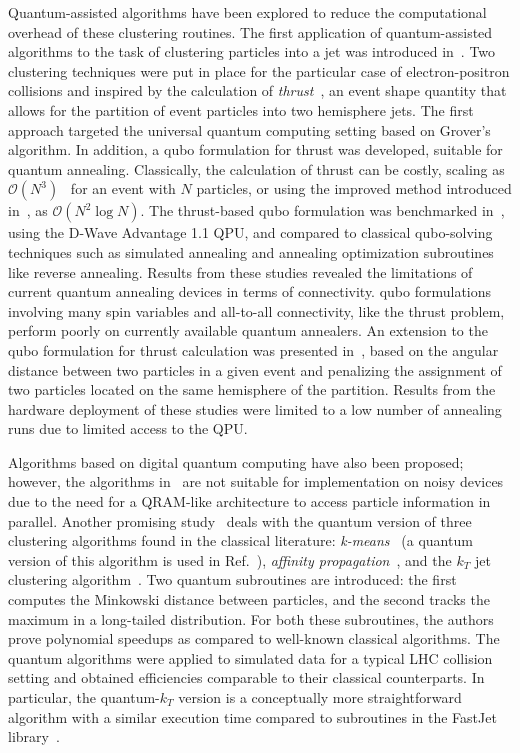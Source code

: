 Quantum-assisted algorithms have been explored to reduce the computational overhead of these clustering routines. The first application of quantum-assisted algorithms to the task of clustering particles into a jet was introduced in~\cite{Wei2020}. Two clustering techniques were put in place for the particular case of electron-positron collisions and inspired by the calculation of \textit{thrust}~\cite{BRANDT196457,PhysRevLett.39.1587}, an event shape quantity that allows for the partition of event particles into two hemisphere jets. The first approach targeted the universal quantum computing setting based on Grover's algorithm. In addition, a \gls{qubo} formulation for thrust was developed, suitable for quantum annealing. Classically, the calculation of thrust can be costly, scaling as $\mathcal{O}(N^3)$~\cite{YAMAMOTO1983597} for an event with $N$ particles, or using the improved method introduced in~\cite{Salam_2007}, as $\mathcal{O}(N^2 \log N)$. The thrust-based \gls{qubo} formulation was benchmarked in~\cite{DelgadoThaler2022}, using the D-Wave Advantage 1.1 QPU, and compared to classical \gls{qubo}-solving techniques such as simulated annealing and annealing optimization subroutines like reverse annealing. Results from these studies revealed the limitations of current quantum annealing devices in terms of connectivity. \gls{qubo} formulations involving many spin variables and all-to-all connectivity, like the thrust problem, perform poorly on currently available quantum annealers. An extension to the \gls{qubo} formulation for thrust calculation was presented in~\cite{pires2020adiabatic}, based on the angular distance between two particles in a given event and penalizing the assignment of two particles located on the same hemisphere of the partition. Results from the hardware deployment of these studies were limited to a low number of annealing runs due to limited access to the QPU.

Algorithms based on digital quantum computing have also been proposed; however, the algorithms in~\cite{pires2021digital, Wei2020} are not suitable for implementation on noisy devices due to the need for a QRAM-like architecture to access particle information in parallel. Another promising study~\cite{deLejarza:2022bwc} deals with the quantum version of three clustering algorithms found in the classical literature: \textit{k-means}~\cite{MacQueen1967} (a quantum version of this algorithm is used in Ref.~\cite{pires2021digital}), \textit{affinity propagation}~\cite{Brendan2007}, and the \textit{$k_T$} jet clustering algorithm~\cite{PhysRevD.48.3160}. Two quantum subroutines are introduced: the first computes the Minkowski distance between particles, and the second tracks the maximum in a long-tailed distribution. For both these subroutines, the authors prove polynomial speedups as compared to well-known classical algorithms.  The quantum algorithms were applied to simulated data for a typical LHC collision setting and obtained efficiencies comparable to their classical counterparts. In particular, the quantum-\textit{$k_T$} version is a conceptually more straightforward algorithm with a similar execution time compared to subroutines in the FastJet library~\cite{Fastjet}. 

